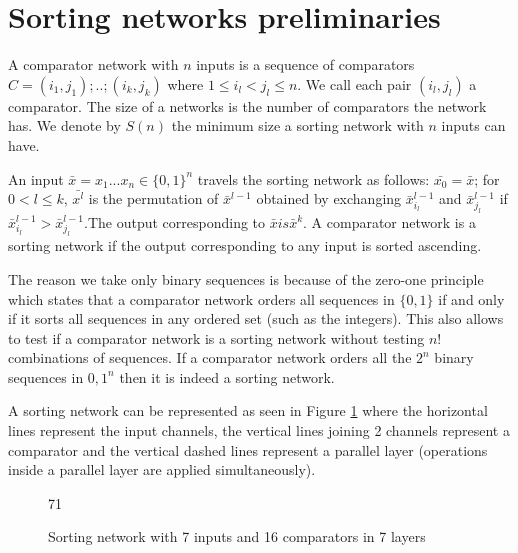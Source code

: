 \documentclass[../main.tex]{subfiles}
\begin{document}
	\section{Sorting networks preliminaries}
	A comparator network with $n$ inputs is a sequence of comparators $C=(i_1,j_1);..;(i_k,j_k)$ where $1 \leq i_l < j_l \leq n$. We call each pair $(i_l,j_l)$ a comparator. The size of a networks is the number of comparators the network has. We denote by $S(n)$ the minimum size a sorting network with $n$ inputs can have.
	
	An input $\bar{x}=x_1...x_n \in \{0, 1\}^n$ travels the sorting network as follows: $\bar{x_0}=\bar{x}$; for $0<l\leq k$, $\bar{x^l}$ is the permutation of $\bar x^{l-1}$ obtained by exchanging $\bar x^{l-1}_{i_l}$ and $\bar x^{l-1}_{j_l}$ if $\bar x^{l-1}_{i_l} > \bar x^{l-1}_{j_l}$.The output corresponding to $\bar x is \bar x^k$.
	A comparator network is a sorting network if the output corresponding to any input is sorted ascending. 
	
	The reason we take only binary sequences is because of the zero-one principle \cite{knuth1997art} which states that a comparator network orders all sequences in $\{0,1\}$ if and only if it sorts all sequences in any ordered set (such as the integers). This also allows to test if a comparator network is a sorting network without testing $n!$ combinations of sequences. If a comparator network orders all the $2^n$ binary sequences in ${0,1}^n$ then it is indeed a sorting network.
	
	A sorting network can be represented as seen in Figure \ref{sortingNetwork1} where the horizontal lines represent the input channels, the vertical lines joining 2 channels represent a comparator and the vertical dashed lines represent a parallel layer (operations inside a parallel layer are applied simultaneously).
	
	\begin{figure}[H]
		\centering
		\begin{sortingnetwork}7{1}
			\nextlayer
			\addlayer
			\nextlayer
			\nextlayer
			\nextlayer
			\addlayer
			\nextlayer
			\nextlayer
			\nextlayer
		\end{sortingnetwork}
		\caption{Sorting network with 7 inputs and 16 comparators in 7 layers}
		\label{sortingNetwork1}
	\end{figure}
\end{document}
